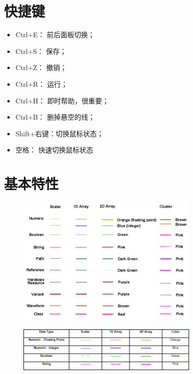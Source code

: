 \section{快捷键}
\begin{itemize}
\item Ctrl+E： 前后面板切换；
\item Ctrl+S： 保存；
\item Ctrl+Z： 撤销；
\item Ctrl+R： 运行；
\item Ctrl+H： 即时帮助，很重要；
\item Ctrl+B： 删掉悬空的线；
\item Shift+右键：切换鼠标状态；
\item 空格： 快速切换鼠标状态
\end{itemize}


\section{基本特性}
\begin{figure}[htbp]
\centering
\includegraphics[width=0.8\textwidth]{pictures/Wire_Colors.png}
\end{figure}

\begin{figure}[htbp]
\centering
\includegraphics[width=0.8\textwidth]{pictures/wire_types.png}
\end{figure}

